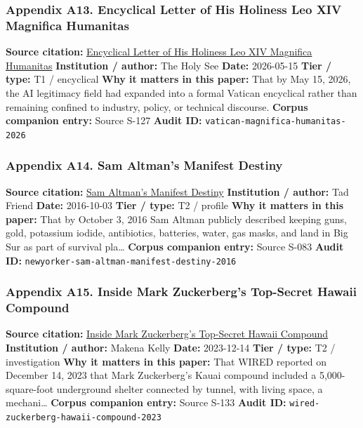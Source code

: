 \documentclass[
  american,
  11pt,
  letterpaper,
]{article}
\begin{document}
\subsubsection{Appendix A13. Encyclical Letter of His Holiness Leo XIV
Magnifica
Humanitas}\label{ch-08-appendix-a13-encyclical-letter-of-his-holiness-leo-xiv-magnifica-humanitas}

\textbf{Source citation:}
\href{https://www.vatican.va/content/leo-xiv/en/encyclicals/documents/20260515-magnifica-humanitas.html}{Encyclical
Letter of His Holiness Leo XIV Magnifica Humanitas} \textbf{Institution
/ author:} The Holy See \textbf{Date:} 2026-05-15 \textbf{Tier / type:}
T1 / encyclical \textbf{Why it matters in this paper:} That by May 15,
2026, the AI legitimacy field had expanded into a formal Vatican
encyclical rather than remaining confined to industry, policy, or
technical discourse. \textbf{Corpus companion entry:} Source S-127
\textbf{Audit ID:} \texttt{vatican-magnifica-humanitas-2026}

\subsubsection{Appendix A14. Sam Altman's Manifest
Destiny}\label{ch-08-appendix-a14-sam-altman-s-manifest-destiny}

\textbf{Source citation:}
\href{https://www.newyorker.com/magazine/2016/10/10/sam-altmans-manifest-destiny}{Sam
Altman's Manifest Destiny} \textbf{Institution / author:} Tad Friend
\textbf{Date:} 2016-10-03 \textbf{Tier / type:} T2 / profile \textbf{Why
it matters in this paper:} That by October 3, 2016 Sam Altman publicly
described keeping guns, gold, potassium iodide, antibiotics, batteries,
water, gas masks, and land in Big Sur as part of survival pla\ldots{}
\textbf{Corpus companion entry:} Source S-083 \textbf{Audit ID:}
\texttt{newyorker-sam-altman-manifest-destiny-2016}

\subsubsection{Appendix A15. Inside Mark Zuckerberg's Top-Secret Hawaii
Compound}\label{ch-08-appendix-a15-inside-mark-zuckerbergs-top-secret-hawaii-compound}

\textbf{Source citation:}
\href{https://www.wired.com/story/mark-zuckerberg-inside-hawaii-compound}{Inside
Mark Zuckerberg's Top-Secret Hawaii Compound} \textbf{Institution /
author:} Makena Kelly \textbf{Date:} 2023-12-14 \textbf{Tier / type:} T2
/ investigation \textbf{Why it matters in this paper:} That WIRED
reported on December 14, 2023 that Mark Zuckerberg's Kauai compound
included a 5,000-square-foot underground shelter connected by tunnel,
with living space, a mechani\ldots{} \textbf{Corpus companion entry:}
Source S-133 \textbf{Audit ID:}
\texttt{wired-zuckerberg-hawaii-compound-2023}
\end{document}
